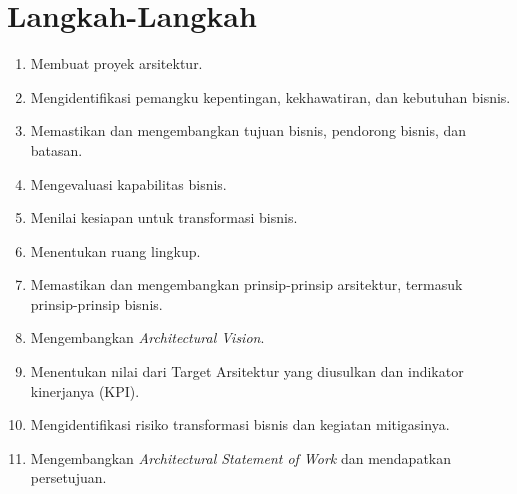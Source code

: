 \section{Langkah-Langkah}
\begin{enumerate}
	\item Membuat proyek arsitektur.
	\item Mengidentifikasi pemangku kepentingan, kekhawatiran, dan kebutuhan bisnis.
	\item Memastikan dan mengembangkan tujuan bisnis, pendorong bisnis, dan batasan.
	\item Mengevaluasi kapabilitas bisnis.
	\item Menilai kesiapan untuk transformasi bisnis.
	\item Menentukan ruang lingkup.
	\item Memastikan dan mengembangkan prinsip-prinsip arsitektur, termasuk prinsip-prinsip bisnis.
	\item Mengembangkan \textit{Architectural Vision}.
	\item Menentukan nilai dari Target Arsitektur yang diusulkan dan indikator kinerjanya (KPI).
	\item Mengidentifikasi risiko transformasi bisnis dan kegiatan mitigasinya.
	\item Mengembangkan \textit{Architectural Statement of Work} dan mendapatkan persetujuan.
\end{enumerate}

